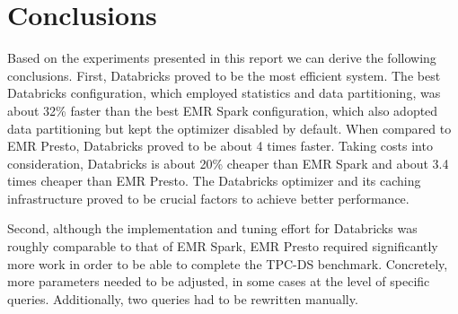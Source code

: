 \section{Conclusions}\label{conclusions}

Based on the experiments presented in this report we can derive the following conclusions. First, Databricks proved to be the most efficient system. The best Databricks configuration, which employed statistics and data partitioning, was about 32\% faster than the best EMR Spark configuration, which also adopted data partitioning but kept the optimizer disabled by default. When compared to EMR Presto, Databricks proved to be about 4 times faster. Taking costs into consideration, Databricks is about 20\% cheaper than EMR Spark and about 3.4 times cheaper than EMR Presto. The Databricks optimizer and its caching infrastructure proved to be crucial factors to achieve better performance.

Second, although the implementation and tuning effort for Databricks was roughly comparable to that of EMR Spark, EMR Presto required significantly more work in order to be able to complete the TPC-DS benchmark. Concretely, more parameters needed to be adjusted, in some cases at the level of specific queries. Additionally, two queries had to be rewritten manually.  

